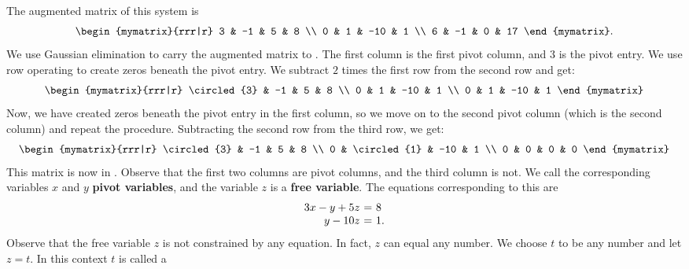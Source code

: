 \begin{solution} The augmented matrix of this system is
  \begin{equation*}
    \begin{mymatrix}{rrr|r}
      3 &  -1  &  5 & 8 \\
      0 &   1 & -10 & 1 \\
      6 &  -1  &  0 & 17
    \end{mymatrix}.
  \end{equation*}
  We use Gaussian elimination to carry the augmented matrix to
  {\ef}. The first column is the first pivot column, and $3$ is the
  pivot entry. We use row operating to create zeros beneath the pivot
  entry. We subtract $2$ times the first row from the second row and get:
  \begin{equation*}
    \begin{mymatrix}{rrr|r}
      \circled{3} &  -1  &  5 & 8 \\
      0 &   1 & -10 & 1 \\
      0 &   1 & -10 & 1
    \end{mymatrix} 
  \end{equation*}
  Now, we have created zeros beneath the pivot entry in the first
  column, so we move on to the second pivot column (which is the
  second column) and repeat the procedure. Subtracting the second row
  from the third row, we get:
  \begin{equation*}
    \begin{mymatrix}{rrr|r}
      \circled{3} &  -1  &  5 & 8 \\
      0 &   \circled{1} & -10 & 1 \\
      0 &   0 & 0 & 0
    \end{mymatrix}
  \end{equation*}
  This matrix is now in {\ef}. Observe that the first two columns are
  pivot columns, and the third column is not. We call the
  corresponding variables $x$ and $y$
  \textbf{pivot variables},
  and the variable $z$ is a
  \textbf{free variable}.
  The equations corresponding to
  this {\ef} are
  \[
    \begin{array}{r@{~}c@{~}l}
      3x - y + 5z &=& 8 \\
      y - 10z &=& 1. 
    \end{array}
  \]
  Observe that the free variable $z$ is not constrained by any
  equation. In fact, $z$ can equal any number. We choose $t$ to be any
  number and let $z = t$.  In this context $t$ is called a

\end{solution}
